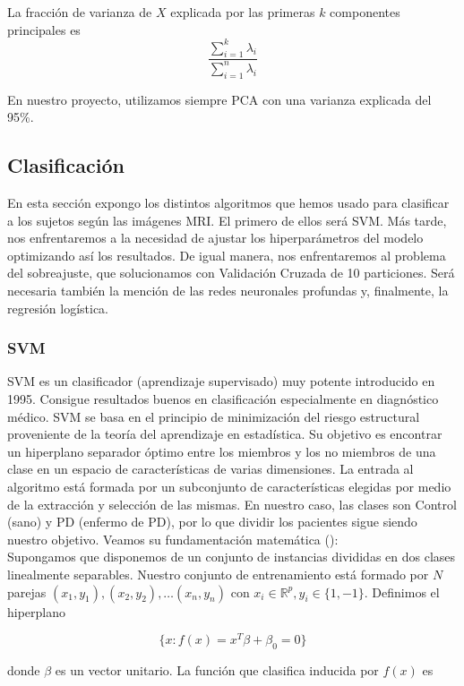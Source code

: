 	La fracción de varianza de $X$ explicada por las primeras $k$ componentes principales es
	$$\frac{\sum_{i=1}^{k} \lambda_i}{\sum_{i=1}^{n} \lambda_i}$$
	

En nuestro proyecto, utilizamos siempre PCA con una varianza explicada del 95\%.
\newpage
\subsection{Clasificación}

En esta sección expongo los distintos algoritmos que hemos usado para clasificar a los sujetos según las imágenes MRI. El primero de ellos será SVM. Más tarde, nos enfrentaremos a la necesidad de ajustar los hiperparámetros del modelo optimizando así los resultados. De igual manera, nos enfrentaremos al problema del sobreajuste, que solucionamos con Validación Cruzada de 10 particiones. Será necesaria también la mención de las redes neuronales profundas y, finalmente, la regresión logística.

\subsubsection{SVM}

SVM es un clasificador (aprendizaje supervisado) muy potente introducido en 1995. Consigue resultados buenos en clasificación especialmente en diagnóstico médico. SVM se basa en el principio de minimización del riesgo estructural proveniente de la teoría del aprendizaje en estadística. Su objetivo es encontrar un hiperplano separador óptimo entre los miembros y los no miembros de una clase en un espacio de características de varias dimensiones. La entrada al algoritmo está formada por un subconjunto de características elegidas por medio de la extracción y selección de las mismas. En nuestro caso, las clases son Control (sano) y PD (enfermo de PD), por lo que dividir los pacientes sigue siendo nuestro objetivo. Veamos su fundamentación matemática (\cite{esl}): \\

Supongamos que disponemos de un conjunto de instancias divididas en dos clases linealmente separables. Nuestro conjunto de entrenamiento está formado por $N$ parejas $(x_1,y_1),(x_2,y_2),\dots (x_n,y_n)$ con $x_i \in \mathbb{R}^p, y_i \in \{1,-1\}$. Definimos el hiperplano

$$\{x:f(x) = x^T \beta + \beta_0 = 0 \}$$

donde $\beta$ es un vector unitario. La función que clasifica inducida por $f(x)$ es 

